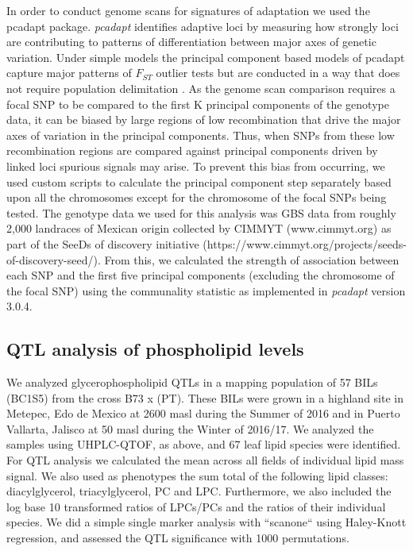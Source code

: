 \documentclass[9pt,twocolumn,twoside]{BioRxiv}
\begin{document}
In order to conduct genome scans for signatures of adaptation we used the pcadapt \cite{Luu2017-ws} package.
\textit{pcadapt} identifies adaptive loci by measuring how strongly loci are contributing to patterns of differentiation between major axes of genetic variation.
Under simple models the principal component based models of pcadapt capture major patterns of $F_{ST}$ outlier tests but are conducted in a way that does not require population delimitation \cite{duforet2014genome}.
As the genome scan comparison requires a focal SNP to be compared to the first K principal components of the genotype data, it can be biased by large regions of low recombination that drive the major axes of variation in the principal components.
Thus, when SNPs from these low recombination regions are compared against principal components driven by linked loci spurious signals may arise.
To prevent this bias from occurring, we used custom scripts to calculate the principal component step separately based upon all the chromosomes except for the chromosome of the focal SNPs being tested.
The genotype data we used for this analysis was GBS data from roughly 2,000 landraces of Mexican origin collected by CIMMYT (www.cimmyt.org) as part of the SeeDs of discovery initiative (https://www.cimmyt.org/projects/seeds-of-discovery-seed/).
From this, we calculated the strength of association between each SNP and the first five principal components (excluding the chromosome of the focal SNP) using the communality statistic as implemented in \textit{pcadapt} version 3.0.4.

\subsection{QTL analysis of phospholipid levels}
We analyzed glycerophospholipid QTLs in a mapping population of 57 BILs (BC1S5) from the cross B73 x (PT).
These BILs were grown in a highland site in Metepec, Edo de Mexico at 2600 masl during the Summer of 2016 and in Puerto Vallarta, Jalisco at 50 masl during the Winter of 2016/17. 
We analyzed the samples using UHPLC-QTOF, as above, and 67 leaf lipid species were identified.
For QTL analysis we calculated the mean across all fields of individual lipid mass signal. 
We also used as phenotypes the sum total of the following lipid classes: diacylglycerol, triacylglycerol, PC and  LPC.  
Furthermore,  we also included the log base 10 transformed ratios of LPCs/PCs and the ratios of their individual species. 
We did a simple single marker analysis  with ``scanone`` using Haley-Knott  regression, and assessed the QTL significance with 1000 permutations.
\end{document}
